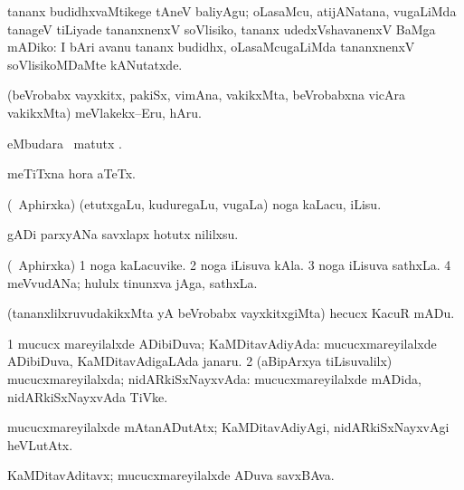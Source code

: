 \noindent
\gl{\pagu}
\bmng
{} tananx budidhxvaMtikege tAneV baliyAgu; oLasaMcu, atijANatana, \mo vugaLiMda tanageV tiLiyade tananxnenxV soVlisiko, tananx udedxVshavanenxV BaMga mADiko:  I bAri avanu tananx budidhx, oLasaMcugaLiMda tananxnenxV soVlisikoMDaMte kANutatxde. 
\emng
\eentry

\bentry
{}
\gl{\sakirx}
\bmng
(beVrobabx vayxkitx, pakiSx, vimAna, \mo vakikxMta, beVrobabxna vicAra \mo vakikxMta) meVlakekx--Eru, hAru. 
\emng
\eentry

\bentry
{}
\gl{\kirx}
\bmng
{} eMbudara \BU\ matutx \BUkaq. 
\emng
\eentry

\bentry
{}
\gl{\nA}
\bmng
meTiTxna hora aTeTx. 
\emng
\eentry

\bentry
{}
\gl{\kirx}
\bmng
\emng

\noindent
\gl{\sakirx}
\expl{}
\bmng
(\da\ Aphirxka) (etutxgaLu, kuduregaLu, \mo vugaLa) noga kaLacu, iLisu. 
\emng

\noindent
\gl{\akirx}
\bmng
gADi parxyANa savxlapx hotutx nililxsu. 
\emng
\eentry

\bentry
{}
\gl{\nA}
\bmng
(\da\ Aphirxka) 
\bnum
\num{1} noga kaLacuvike. 
\num{2} noga iLisuva kAla. 
\num{3} noga iLisuva sathxLa. 
\num{4} meVvudANa; hululx tinunxva jAga, sathxLa. 
\enum
\emng
\eentry

\bentry
{}
\gl{\sakirx}
\bmng
(tananxlilxruvudakikxMta yA beVrobabx vayxkitxgiMta) hecucx KacuR mADu. 
\emng
\eentry

\bentry
{}
\gl{\gu}
\bmng
\bnum
\num{1} mucucx mareyilalxde ADibiDuva; KaMDitavAdiyAda:  mucucxmareyilalxde ADibiDuva, KaMDitavAdigaLAda janaru. 
\num{2} (aBipArxya tiLisuvalilx) mucucxmareyilalxda; nidARkiSxNayxvAda:  mucucxmareyilalxde mADida, nidARkiSxNayxvAda TiVke. 
\enum
\emng
\eentry

\bentry
{}
\gl{\kirxvi}
\bmng
mucucxmareyilalxde mAtanADutAtx; KaMDitavAdiyAgi, nidARkiSxNayxvAgi heVLutAtx. 
\emng
\eentry

\bentry
{}
\gl{\nA}
\bmng
KaMDitavAditavx; mucucxmareyilalxde ADuva savxBAva. 
\emng
\eentry

